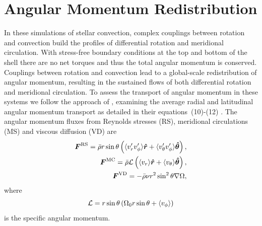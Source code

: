 \section{Angular Momentum Redistribution}
\label{sec:angular momentum}
In these simulations of stellar convection, complex couplings between
rotation and convection build the profiles of differential rotation and
meridional circulation.
With stress-free boundary conditions at the top and bottom of the
shell there are no net torques and thus the total angular momentum is conserved.
Couplings between rotation and convection lead to a global-scale
redistribution of angular momentum, resulting in the sustained flows of both
differential rotation and meridional circulation.  To assess the
transport of angular momentum in these systems we follow the approach
of \cite{Miesch_et_al_2008}, examining the average radial and latitudinal
angular momentum transport as detailed in their equations~(10)-(12)
\citep[see also][]{Brun&Toomre_2002,Miesch_2005}. 
The angular momentum fluxes from Reynolds stresses (RS), meridional
circulations (MS) and viscous diffusion (VD) are
\begin{eqnarray}
  \vec{F}^{\mathrm{RS}} = \bar{\rho} r \sin{\theta} 
  \left(\langle v_r' v_\phi' \rangle \vec{\hat{r}} +
        \langle v_\theta' v_\phi' \rangle \vec{\hat{\theta}} \right),
	\label{eq:F_RS}\\
%
  \vec{F}^{\mathrm{MC}} = \bar{\rho} {\cal L} 
  \left(\langle v_r \rangle \vec{\hat{r}} +
        \langle v_\theta \rangle \vec{\hat{\theta}} \right),
	\label{eq:F_MC}\\
%
  \vec{F}^{\mathrm{VD}} = -\bar{\rho} \nu r^2 \sin^2{\theta} \nabla \Omega,
  \label{eq:F_VD}
\end{eqnarray}
where 
\begin{equation}
{\cal L} = r \sin\theta \left(\Omega_0 r \sin\theta + \left<v_\phi\right>\right)
\end{equation}
is the specific angular momentum.

